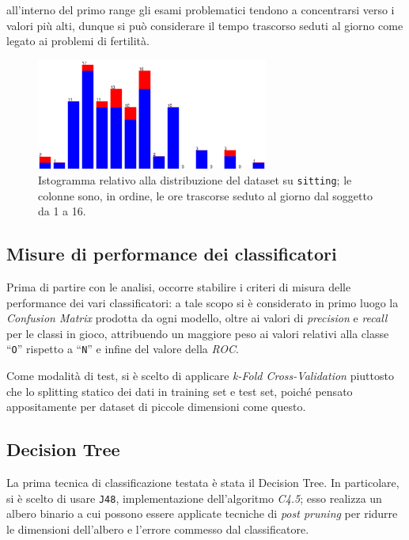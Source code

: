 \begin{itemize}
    all'interno del primo range gli esami problematici tendono a concentrarsi verso i valori più alti, dunque si può considerare il tempo trascorso seduti al giorno come legato ai problemi di fertilità.
    \begin{figure}[H]
      \centering
      \includegraphics[width=0.68\textwidth]{fig/sit-discrete.eps}%
      \caption{%
        Istogramma relativo alla distribuzione del dataset su \texttt{sitting};
        le colonne sono, in ordine, le ore trascorse seduto al giorno dal soggetto da 1 a 16.
      }%
      \label{fig:sit}
    \end{figure}
\end{itemize}

\subsection{Misure di performance dei classificatori}

Prima di partire con le analisi, occorre stabilire i criteri di misura delle performance dei vari classificatori:
a tale scopo si è considerato in primo luogo la \emph{Confusion Matrix} prodotta da ogni modello, oltre ai valori di \emph{precision} e \emph{recall} per le classi in gioco, attribuendo un maggiore peso ai valori relativi alla classe ``\texttt{O}'' rispetto a ``\texttt{N}'' e infine del valore della \emph{ROC}\@.

Come modalità di test, si è scelto di applicare \emph{k-Fold Cross-Validation} piuttosto che lo splitting statico dei dati in training set e test set, poiché pensato appositamente per dataset di piccole dimensioni come questo.

\subsection{Decision Tree}\label{subsec:tree}

La prima tecnica di classificazione testata è stata il Decision Tree.
In particolare, si è scelto di usare \texttt{J48}, implementazione dell'algoritmo \emph{C4.5};
esso realizza un albero binario a cui possono essere applicate tecniche di \emph{post pruning}
per ridurre le dimensioni dell'albero e l'errore commesso dal classificatore.

